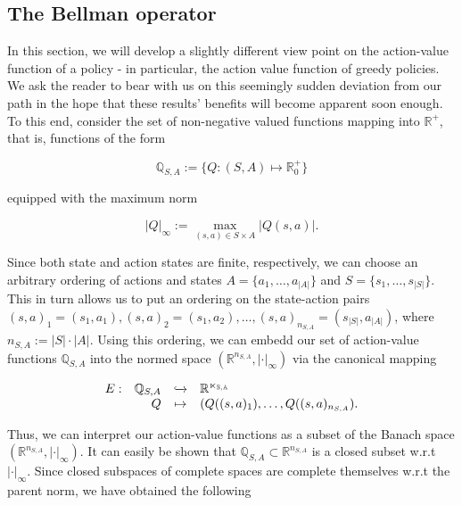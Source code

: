 \documentclass[11pt]{article} %
\begin{document}
\subsection{The Bellman operator}

In this section, we will develop a slightly different view point on the action-value function of a policy - in particular, the action value function of greedy policies. We ask the reader to bear with us on this seemingly sudden deviation from our path in the hope that these results' benefits will become apparent soon enough. To this end, consider the set of non-negative valued functions mapping into $\mathbb{R}^+$, that is, functions of the form

\begin{equation}\label{eq_actStateSet}
	\mathbb{Q}_{S,A} := \{ Q: (S,A) \mapsto \mathbb{R}^+_0\}
\end{equation}

equipped with the maximum norm

\begin{equation}
	|Q|_{\infty} := \max\limits_{(s,a) \in S \times A} |Q(s,a)|.
\end{equation}

Since both state and action states are finite, respectively, we can choose an arbitrary ordering of actions and states $A = \{a_1,\dots,a_{|A|}\}$ and $S = \{s_1,\dots,s_{|S|}\}$. This in turn allows us to put an ordering on the state-action pairs $(s,a)_1 = (s_1,a_1), (s,a)_2 = (s_1,a_2),\dots,(s,a)_{n_{S,A}} = (s_{|S|},a_{|A|})$, where $n_{S,A}:=|S|\cdot|A|$. Using this ordering, we can embedd our set of action-value functions $\mathbb{Q}_{S,A}$ into the normed space $(\mathbb{R}^{n_{S,A}},|\cdot|_{\infty})$ via the canonical mapping

\begin{equation}
	\begin{array}{rrcl}
		E: 	& \mathbb{Q}_{S,A}	& \xhookrightarrow	&	\mathbb{R^{n_{S,A}}} \\
			& Q				& \mapsto			&	(Q((s,a)_1),\dots,Q((s,a)_{n_{S,A}}).
	\end{array}
\end{equation}

Thus, we can interpret our action-value functions as a subset of the Banach space $(\mathbb{R}^{n_{S,A}},|\cdot|_{\infty})$. It can easily be shown that $\mathbb{Q}_{S,A} \subset \mathbb{R}^{n_{S,A}}$ is a closed subset w.r.t $|\cdot|_{\infty}$. Since closed subspaces of complete spaces are complete themselves w.r.t the parent norm, we have obtained the following
\end{document}

